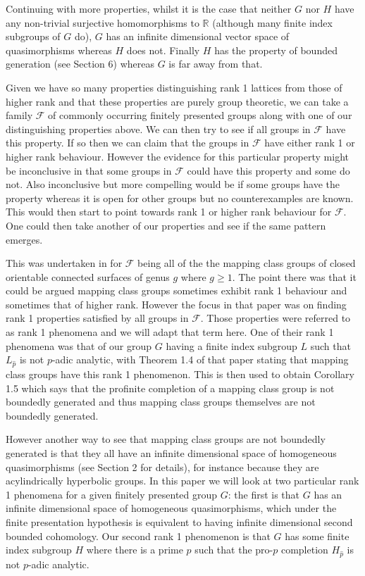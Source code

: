 \documentclass[11pt,reqno]{amsart}
\numberwithin{equation}{section}
\newcommand{\R}{\mathbb{R}}
\newcommand{\geqs}{\geqslant}
\theoremstyle{definition}
\theoremstyle{remark}
\begin{document}
Continuing with more properties, whilst it is the case that neither $G$ nor
$H$ have any non-trivial surjective homomorphisms to $\R$ (although many
finite index subgroups of $G$ do), $G$ has an infinite dimensional
vector space of quasimorphisms whereas $H$ does not. Finally $H$ has the
property of bounded generation (see Section 6) whereas $G$ is far away from
that.

Given we have so many properties distinguishing rank 1 lattices from those of
higher rank and that these properties are purely group theoretic, we can
take a family $\mathcal F$ of commonly occurring finitely presented groups
along with one of our distinguishing properties above. We can then try to see if
all groups in $\mathcal F$ have this property.
If so then we can claim that
the groups in $\mathcal F$ have either rank 1 or higher rank behaviour.
However the evidence for this particular property might be inconclusive
in that some groups in $\mathcal F$ could have this property and some
do not. Also inconclusive but more compelling would be if some groups
have the property whereas it is open for other groups but no counterexamples
are known. This would then start to point towards rank 1 or higher rank
behaviour for $\mathcal F$. One could then take another of our properties
and see if the same pattern emerges.

This was undertaken in \cite{flm} for $\mathcal F$ being all of the
the mapping class groups of closed orientable connected surfaces of genus
$g$ where $g\geqs 1$. The point there was that it could be argued mapping
class groups sometimes exhibit rank 1 behaviour and sometimes that of
higher rank. However the focus in that paper was on finding rank 1 properties
satisfied by all groups in $\mathcal F$. Those properties were referred to
as rank 1 phenomena and we will adapt that term here. One of their rank 1
phenomena was that of our group $G$ having a finite index subgroup $L$
such that $L_{\hat{p}}$ is not $p$-adic analytic, with Theorem
1.4 of that paper stating that mapping class groups have this rank 1 phenomenon.
This is then used to obtain Corollary 1.5 which says that the profinite
completion of a mapping class group is not boundedly generated and thus mapping
class groups themselves are not boundedly generated.

However another way to see that mapping class groups are not boundedly
generated is that they all have an infinite dimensional space of
homogeneous quasimorphisms (see Section 2 for details),
for instance because they are acylindrically hyperbolic
groups. In this paper we will look at two particular rank 1 phenomena
for a given finitely presented group $G$: the first is that $G$ has an
infinite dimensional space of homogeneous quasimorphisms, which under
the finite presentation hypothesis is equivalent to having infinite
dimensional second bounded cohomology. Our second rank 1 phenomenon is
that $G$ has some finite index subgroup $H$ where there is a prime $p$
such that the pro-$p$ completion $H_{\hat{p}}$ is not $p$-adic analytic.
\end{document}

